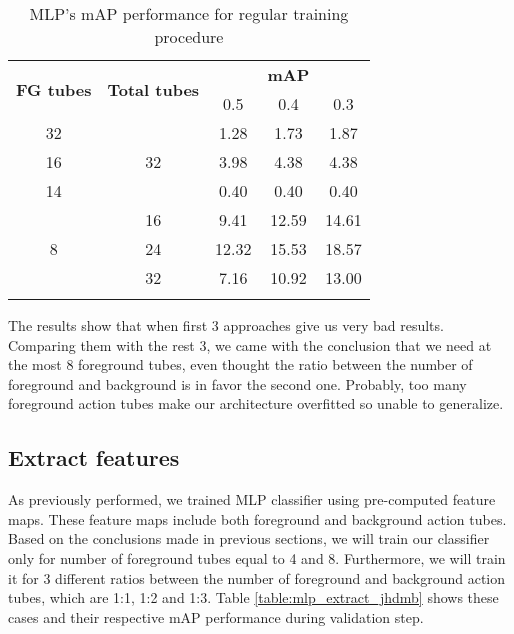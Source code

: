 \begin{center}
  \begin{longtable}{|| c | c || c c c ||}
    \hline
    \multirow{2}{*}{\textbf{FG tubes}} & \multirow{2}{*}{\textbf{Total tubes}} & {} &  \textbf{mAP} & {} \\
    {} & {} & 0.5 & 0.4 & 0.3 \\
    \hline
    32 & \multirow{3}{*}{32} &1.28 & 1.73 & 1.87  \\
    \cline{1-1} \cline{3-5}
    16 & {} & 3.98 & 4.38 & 4.38  \\
    \cline{1-1} \cline{3-5}
    14 & {} & 0.40 & 0.40 & 0.40 \\
    \hline
    \multirow{3}{*}{8} & 16 & 9.41 & 12.59 & 14.61 \\
    \cline{2-5}
    {} & 24 & 12.32 & 15.53 & 18.57 \\
    \cline{2-5}
    {} & 32 & 7.16 & 10.92 & 13.00 \\
    \hline
    \caption{MLP's mAP performance for regular training procedure}
    \label{table:mlp_reg}
  \end{longtable}
\end{center}

The results show that when first 3 approaches give us very bad results. Comparing them with the rest 3, we came with the conclusion that we
need at the most 8 foreground tubes, even thought the ratio between the number of foreground and background is in favor the second one.
Probably, too many foreground action tubes make our architecture overfitted so unable to generalize.

\subsection{Extract features}

As previously performed, we trained MLP classifier using pre-computed feature maps. These feature maps include both foreground and background
action tubes. Based on the conclusions made in previous sections, we will train our classifier only for number of foreground tubes equal to 4
and 8. Furthermore, we will train it for 3 different ratios between the number of foreground and background action tubes, which are 1:1, 1:2
and 1:3. Table \ref{table:mlp_extract_jhdmb} shows these cases and their respective mAP performance during validation step.


